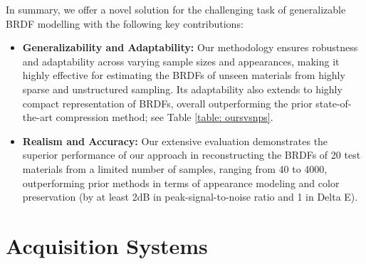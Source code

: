 In summary, we offer a novel solution for the challenging task of generalizable BRDF modelling with the following key contributions:
\begin{itemize}
    \item{\textbf{Generalizability and Adaptability:} Our methodology ensures robustness and adaptability across varying sample sizes and appearances, making it highly effective for estimating the BRDFs of unseen materials from highly sparse and unstructured sampling. Its adaptability also extends to highly compact representation of BRDFs, overall outperforming the prior state-of-the-art compression method; see Table \ref{table: oursvsnps}.}
    

    \item{\textbf{Realism and Accuracy:}
    Our extensive evaluation demonstrates the superior performance of our approach in reconstructing the BRDFs of 20 test materials from a limited number of samples, ranging from 40 to 4000, outperforming prior methods in terms of appearance modeling and color preservation (by at least 2dB in peak-signal-to-noise ratio and 1 in Delta E).
    }
\end{itemize}


\section{Acquisition Systems}
\label{sec:Acquisition-Systems}
